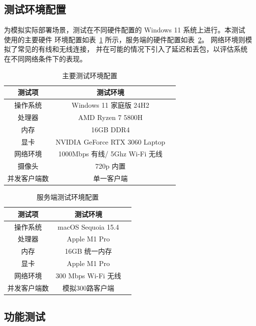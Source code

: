 \subsection{测试环境配置}

为模拟实际部署场景，测试在不同硬件配置的 Windows 11 系统上进行。本测试使用的主要硬件
环境配置如表~\ref{tab:test_env_specific} 所示，服务端的硬件配置如表~\ref{tab:service_env_specific}。
网络环境则模拟了常见的有线和无线连接，
并在可能的情况下引入了延迟和丢包，以评估系统在不同网络条件下的表现。

\begin{table}[htbp]
  \centering
  \caption{主要测试环境配置}
  \label{tab:test_env_specific}
  \begin{tabular}{ccc}
    \hline
    \textbf{测试项} & \textbf{测试环境} \\
    \hline
    操作系统 & Windows 11 家庭版 24H2 \\
    处理器 &  AMD Ryzen 7 5800H \\
    内存 &  16GB DDR4 \\
    显卡 & NVIDIA GeForce RTX 3060 Laptop \\
    网络环境 & 1000Mbps 有线/ 5Ghz Wi-Fi 无线 \\
    摄像头 & 720p 内置 \\
    并发客户端数 & 单一客户端 \\
    \hline
  \end{tabular}
\end{table}



\begin{table}[htbp]
\centering
\caption{服务端测试环境配置}
\label{tab:service_env_specific}
\begin{tabular}{ccc}
    \hline
    \textbf{测试项} & \textbf{测试环境} \\
    \hline
    操作系统 & macOS Sequoia 15.4 \\
    处理器 &  Apple M1 Pro \\
    内存 &  16GB 统一内存 \\
    显卡 & Apple M1 Pro \\
    网络环境 & 300 Mbps Wi-Fi 无线 \\
    并发客户端数 & 模拟300路客户端 \\
    \hline
\end{tabular}
\end{table}

\subsection{功能测试}

